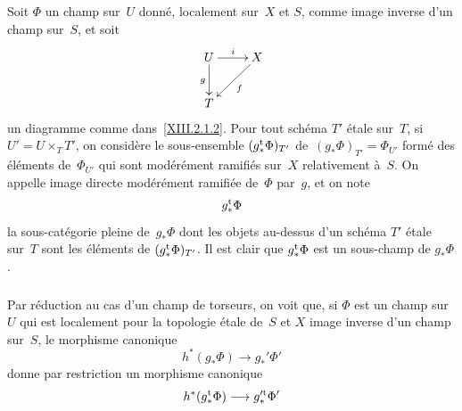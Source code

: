 \subsubsection{}
\label{XIII.2.2.1}
Soit $\Phi$ un champ sur~$U$ donn\'e, localement sur~$X$ et $S$,
comme image inverse d'un champ sur~$S$, et soit
$$
\xymatrix{{U}\ar[r]^i\ar[d]_g&{X}\ar[dl]^f\\{T}}
$$
un diagramme comme dans~\ref{XIII.2.1.2}. Pour tout sch\'ema $T'$
\'etale sur~$T$, si $U'=U\times_T T'$, on consid\`ere le
sous-ensemble $(g_*^{\mathrm{t}}\Phi)_{T'}$
\label{indnot:mg}de~$(g_*\Phi)_{T'}=\Phi_{U'}$
form\'e
des \'el\'ements de~$\Phi_{U'}$ qui sont mod\'er\'ement
ramifi\'es
sur~$X$ relativement \`a~$S$. On appelle image directe
mod\'er\'ement ramifi\'ee
de~$\Phi$ par~$g$, et on note
$$
g_*^{\mathrm{t}}\Phi
$$
la sous-cat\'egorie pleine de~$g_*\Phi$ dont les objets au-dessus
d'un sch\'ema $T'$ \'etale sur~$T$ sont les \'el\'ements de
$(g_*^{\mathrm{t}}\Phi)_{T'}$. Il est clair que $g_*^{\mathrm{t}}\Phi$ est un sous-champ de
$g_*\Phi$.

\subsubsection{}
\label{XIII.2.2.2}
Par r\'eduction au cas d'un champ de torseurs, on voit que, si
$\Phi$ est un champ sur~$U$ qui est localement pour la topologie
\'etale de~$S$ et $X$ image inverse d'un champ sur~$S$, le morphisme
canonique
$$
h^*(g_*\Phi)\to g_*'\Phi'
$$
donne par restriction un morphisme canonique
$$
h^*(g_*^{\tame}\Phi)\to g_*^{\prime\tame}\Phi'
$$

